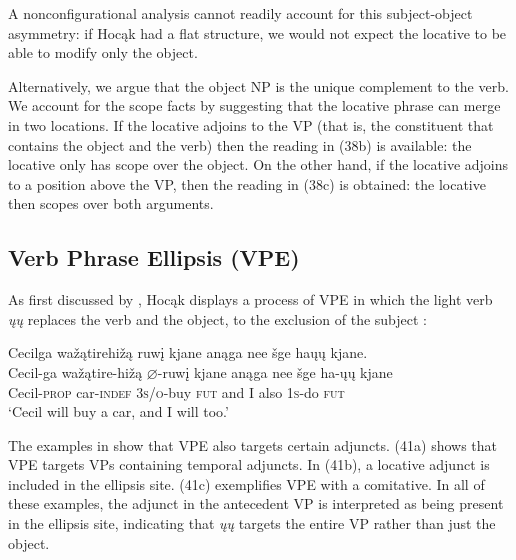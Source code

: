 \documentclass[output=paper]{LSP/langsci}
\begin{document}
A nonconfigurational analysis cannot readily account for this subject-object asymmetry: if Hocąk had a flat structure, we would not expect the locative to be able to modify only the object.
	
Alternatively, we argue that the object NP is the unique complement to the verb. We account for the scope facts by suggesting that the locative phrase can merge in two locations. If the locative adjoins to the VP (that is, the constituent that contains the object and the verb) then the reading in (38b) is available: the locative only has scope over the object. On the other hand, if the locative adjoins to a position above the VP, then the reading in (38c) is obtained: the locative then scopes over both arguments.

\subsection{Verb Phrase Ellipsis (VPE)}

As first discussed by \citet{Johnson2013}, Hocąk displays a process of VPE in which the light verb \textit{\k{u}\k{u}} replaces the verb and the object, to the exclusion of the subject :

\begin{exe}
\ex 
\glll Cecilga	wa\v{z}ątirehi\v{z}ą		ruw\k{i}	kjane		anąga	nee		\v{s}ge		ha\k{u}\k{u}			kjane.\\
Cecil-ga	wa\v{z}ątire-hi\v{z}ą	$\varnothing$-ruw\k{i}		kjane		anąga	nee	\v{s}ge ha-\k{u}\k{u}		kjane \\
Cecil-\textsc{prop}		car-\textsc{indef}			\textsc{3s/o}-buy		\textsc{fut}	and	I	also	\textsc{1s}-do	\textsc{fut} \\
\trans `Cecil will buy a car, and I will too.'
\end{exe}

The examples in  show that VPE also targets certain adjuncts. (41a) shows that VPE targets VPs containing temporal adjuncts. In (41b), a locative adjunct is included in the ellipsis site. (41c) exemplifies VPE with a comitative. In all of these examples, the adjunct in the antecedent VP is interpreted as being present in the ellipsis site, indicating that \textit{\k{u}\k{u}} targets the entire VP rather than just the object.
\end{document}
